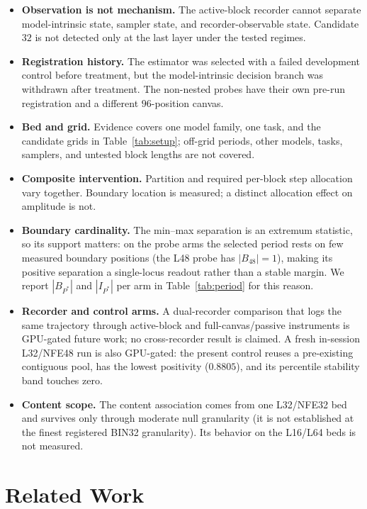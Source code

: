 \documentclass{article}
\begin{document}
\begin{itemize}
  \item \textbf{Observation is not mechanism.} The active-block recorder cannot
  separate model-intrinsic state, sampler state, and recorder-observable state.
  Candidate $32$ is not detected only at the last layer under the tested regimes.
  \item \textbf{Registration history.} The estimator was selected with a failed
  development control before treatment, but the model-intrinsic decision branch
  was withdrawn after treatment. The non-nested probes have their own pre-run
  registration and a different $96$-position canvas.
  \item \textbf{Bed and grid.} Evidence covers one model family, one task, and the
  candidate grids in Table~\ref{tab:setup}; off-grid periods, other models, tasks,
  samplers, and untested block lengths are not covered.
  \item \textbf{Composite intervention.} Partition and required per-block step
  allocation vary together. Boundary location is measured; a distinct allocation
  effect on amplitude is not.
  \item \textbf{Boundary cardinality.} The min--max separation is an extremum
  statistic, so its support matters: on the probe arms the selected period rests
  on few measured boundary positions (the L48 probe has $|B_{48}|{=}1$), making
  its positive separation a single-locus readout rather than a stable margin. We
  report $|B_{P^*}|$ and $|I_{P^*}|$ per arm in Table~\ref{tab:period} for this
  reason.
  \item \textbf{Recorder and control arms.} A dual-recorder comparison that logs
  the same trajectory through active-block and full-canvas/passive instruments is
  GPU-gated future work; no cross-recorder result is claimed. A fresh in-session
  L32/NFE48 run is also GPU-gated: the present control reuses a pre-existing
  contiguous pool, has the lowest positivity ($0.8805$), and its percentile
  stability band touches zero.
  \item \textbf{Content scope.} The content association comes from one L32/NFE32
  bed and survives only through moderate null granularity (it is not established
  at the finest registered BIN32 granularity). Its behavior on the L16/L64 beds is
  not measured.
\end{itemize}

\section{Related Work}\label{sec:related}
\end{document}
